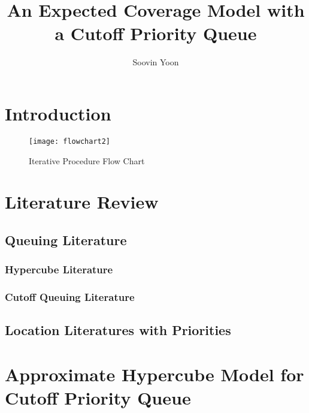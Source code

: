 \documentclass{article}
\title{An Expected Coverage Model with a Cutoff Priority Queue}
\author{Soovin Yoon}
\begin{document}
\maketitle



\section{Introduction}



\begin{figure}
\centering
\texttt{[image: flowchart2]}
\caption{Iterative Procedure Flow Chart}
\label{fig:flowchart}
\end{figure}

\section{Literature Review}
\subsection{Queuing Literature}


\subsubsection{Hypercube Literature}
\subsubsection{Cutoff Queuing Literature}
\subsection{Location Literatures with Priorities}



\section{Approximate Hypercube Model for Cutoff Priority Queue}
\end{document}
